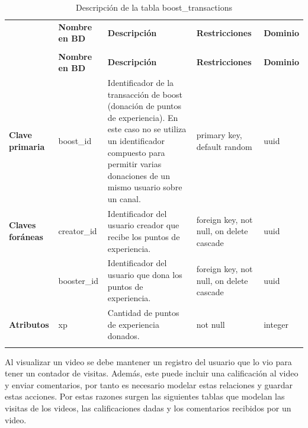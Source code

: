 \renewcommand{\arraystretch}{1.35}
\setlength{\tabcolsep}{3pt}
\small

\begin{longtable}{|
>{\raggedright\arraybackslash}p{1.9cm}|
>{\raggedright\arraybackslash}p{2.7cm}|
>{\raggedright\arraybackslash}p{4.9cm}|
>{\raggedright\arraybackslash}p{2.7cm}|
>{\raggedright\arraybackslash}p{2.1cm}|
}
\hline

\rowcolor[gray]{0.75}
\multicolumn{5}{|c|}{\textbf{Transacciones de boost}} \\
\hline

 & \textbf{Nombre en BD} & \textbf{Descripción} & \textbf{Restricciones} & \textbf{Dominio} \\
\hline
\endfirsthead

\hline
\rowcolor[gray]{0.75}
\multicolumn{5}{|c|}{\textbf{Transacciones de boost}} \\
\hline

 & \textbf{Nombre en BD} & \textbf{Descripción} & \textbf{Restricciones} & \textbf{Dominio} \\
\hline
\endhead

\textbf{Clave primaria}
& boost\_\allowbreak id
& Identificador de la transacción de boost (donación de puntos de experiencia). En este caso no se utiliza un identificador compuesto para permitir varias donaciones de un mismo usuario sobre un canal.  
& primary key, default random
& uuid \\
\hline

\textbf{Claves foráneas}
& creator\_\allowbreak id
& Identificador del usuario creador que recibe los puntos de experiencia.
& foreign key, not null, on delete cascade
& uuid \\
\cline{2-5}

& booster\_\allowbreak id
& Identificador del usuario que dona los puntos de experiencia.
& foreign key, not null, on delete cascade
& uuid \\
\hline

\textbf{Atributos}
& xp
& Cantidad de puntos de experiencia donados.
& not null
& integer \\
\hline

\caption{Descripción de la tabla boost\_transactions}
\end{longtable}

Al visualizar un video se debe mantener un registro del usuario que lo vio para tener un contador de visitas. Además, este puede incluir una calificación al video y enviar comentarios, por tanto es necesario modelar estas relaciones y guardar estas acciones. Por estas razones surgen las siguientes tablas que modelan las visitas de los videos, las calificaciones dadas y los comentarios recibidos por un video.

